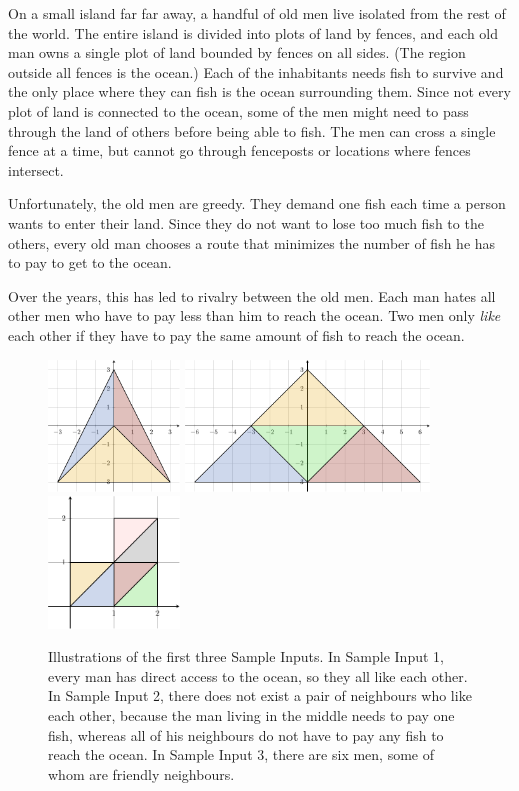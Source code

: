 \problemname{\problemyamlname}

On a small island far far away, a handful of old men live isolated from the rest of the world.
The entire island is divided into plots of land by fences, and each old man owns
a single plot of land bounded by fences on all sides. (The region
outside all fences is the ocean.)
Each of the inhabitants needs fish to survive and the only place where they can fish is the ocean surrounding them.
Since not every plot of land is connected to the ocean,
some of the men might need to pass through the land of others before being able to fish.
The men can cross a single fence at a time, but cannot go through fenceposts or
locations where fences intersect.

Unfortunately, the old men are greedy.
They demand one fish each time a person wants to enter their land.
Since they do not want to lose too much fish to the others,
every old man chooses a route that minimizes the number of fish he has to pay to get to the ocean.

Over the years, this has led to rivalry between the old men.
Each man hates all other men who have to pay less than him to reach the ocean.
Two men only \emph{like} each other if they have to pay the same amount of fish to reach the ocean.

\begin{figure}[h]
  \centering
  \hfill
  \includegraphics[height=3.5cm]{sample1.pdf}
  \hfill
  \includegraphics[height=3.5cm]{sample2.pdf}
  \hfill
  \includegraphics[height=3.5cm]{sample3.pdf}
  \hfill
  \hfill
  \caption{
    Illustrations of the first three Sample Inputs.
    In Sample Input 1, every man has direct access to the ocean, so they all like each other.
    In Sample Input 2, there does not exist a pair of neighbours who like each other,
    because the man living in the middle needs to pay one fish,
    whereas all of his neighbours do not have to pay any fish to reach the ocean.
    In Sample Input 3, there are six men, some of whom are friendly neighbours.
  }
  \label{fig:islands}
\end{figure}

